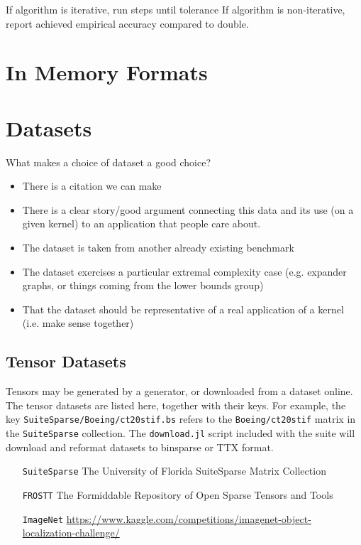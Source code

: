 \documentclass{article}
\begin{document}
If algorithm is iterative, run steps until tolerance
If algorithm is non-iterative, report achieved empirical accuracy compared to double.

\section{In Memory Formats}


\section{Datasets}

What makes a choice of dataset a good choice?
\begin{itemize}
    \item There is a citation we can make
    \item There is a clear story/good argument connecting this data and its use (on a given kernel) to an application that people care about.
    \item The dataset is taken from another already existing benchmark
    \item The dataset exercises a particular extremal complexity case (e.g. expander graphs, or things coming from the lower bounds group)
    \item That the dataset should be representative of a real application of a  kernel (i.e. make sense together)
\end{itemize}

\subsection{Tensor Datasets}

	Tensors may be generated by a generator, or downloaded from a dataset
	online. The tensor datasets are listed here, together with their keys. For
	example, the key \texttt{SuiteSparse/Boeing/ct20stif.bs} refers to the
	\texttt{Boeing/ct20stif} matrix in the \texttt{SuiteSparse} collection. The
	\texttt{download.jl} script included with the suite will download and reformat
	datasets to binsparse or TTX format.

	\begin{itemize}
		\item[\texttt{SuiteSparse}] The University of Florida SuiteSparse Matrix Collection \cite{davis_university_2011}
		\item[\texttt{FROSTT}] The Formiddable Repository of Open Sparse Tensors and Tools \cite{smith_frostt_2017}
		\item[\texttt{ImageNet}] \url{https://www.kaggle.com/competitions/imagenet-object-localization-challenge/}
	\end{itemize}
\end{document}

